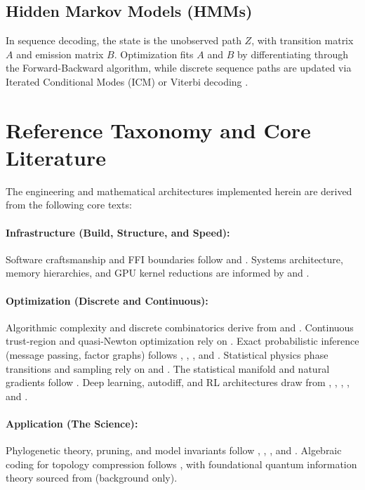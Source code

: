 \documentclass[11pt,a4paper]{article}
\begin{document}
\subsection{Hidden Markov Models (HMMs)}
In sequence decoding, the state is the unobserved path $Z$, with transition matrix $A$ and emission matrix $B$. Optimization fits $A$ and $B$ by differentiating through the Forward-Backward algorithm, while discrete sequence paths are updated via Iterated Conditional Modes (ICM) or Viterbi decoding \citep{mackay2003}.

\section{Reference Taxonomy and Core Literature}
\label{app:taxonomy}
The engineering and mathematical architectures implemented herein are derived from the following core texts:

\paragraph{Infrastructure (Build, Structure, and Speed):}
Software craftsmanship and FFI boundaries follow \citet{martin2008} and \citet{blandy2021}. Systems architecture, memory hierarchies, and GPU kernel reductions are informed by \citet{bryant2015} and \citet{pmpp2022}.

\paragraph{Optimization (Discrete and Continuous):}
Algorithmic complexity and discrete combinatorics derive from \citet{clrs2022} and \citet{rosen2019}. Continuous trust-region and quasi-Newton optimization rely on \citet{nocedal2006}. Exact probabilistic inference (message passing, factor graphs) follows \citet{mackay2003}, \citet{koller2009}, \citet{frey1998}, and \citet{ortega2022}. Statistical physics phase transitions and sampling rely on \citet{mezard2009} and \citet{newman1999}. The statistical manifold and natural gradients follow \citet{amari2016}. Deep learning, autodiff, and RL architectures draw from \citet{goodfellow2016}, \citet{prince2023}, \citet{suttonbarto2018}, \citet{lapan2020}, and \citet{raschka2024}.

\paragraph{Application (The Science):}
Phylogenetic theory, pruning, and model invariants follow \citet{felsenstein2004}, \citet{durbin1998}, \citet{compeau2015}, and \citet{pachter2005}. Algebraic coding for topology compression follows \citet{blahut2003}, with foundational quantum information theory sourced from \citet{nielsen2010} (background only).
\end{document}
